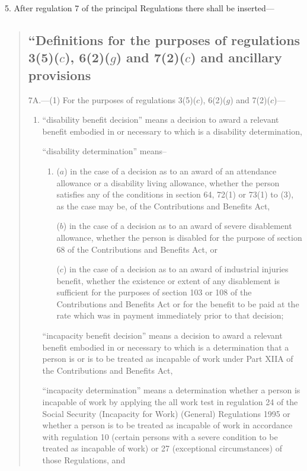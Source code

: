 \documentclass[12pt,a4paper]{article}
\begin{document}
5.  After regulation 7 of the principal Regulations there shall be inserted---
\begin{quotation}
\subsection*{“Definitions for the purposes of regulations 3(5)($c$), 6(2)($g$) and 7(2)($c$) and ancillary provisions}

7A.---(1)  For the purposes of regulations 3(5)($c$), 6(2)($g$) and 7(2)($c$)---
\begin{enumerate}\item[]
“disability benefit decision” means a decision to award a relevant benefit embodied in or necessary to which is a disability determination,

“disability determination” means–
\begin{enumerate}\item[]
($a$)
in the case of a decision as to an award of an attendance allowance or a disability living allowance, whether the person satisfies any of the conditions in section 64, 72(1) or 73(1) to (3), as the case may be, of the Contributions and Benefits Act,

($b$)
in the case of a decision as to an award of severe disablement allowance, whether the person is disabled for the purpose of section 68 of the Contributions and Benefits Act, or

($c$)
in the case of a decision as to an award of industrial injuries benefit, whether the existence or extent of any disablement is sufficient for the purposes of section 103 or 108 of the Contributions and Benefits Act or for the benefit to be paid at the rate which was in payment immediately prior to that decision;
\end{enumerate}

“incapacity benefit decision” means a decision to award a relevant benefit embodied in or necessary to which is a determination that a person is or is to be treated as incapable of work under Part XIIA of the Contributions and Benefits Act,

\begin{sloppypar}
“incapacity determination” means a determination whether a person is incapable of work by applying the all work test in regulation 24 of the Social Security (Incapacity for Work) (General) Regulations 1995 or whether a person is to be treated as incapable of work in accordance with regulation 10 (certain persons with a severe condition to be treated as incapable of work) or 27 (exceptional circumstances) of those Regulations, and
\end{sloppypar}


\end{enumerate}
\end{quotation}
\end{document}
